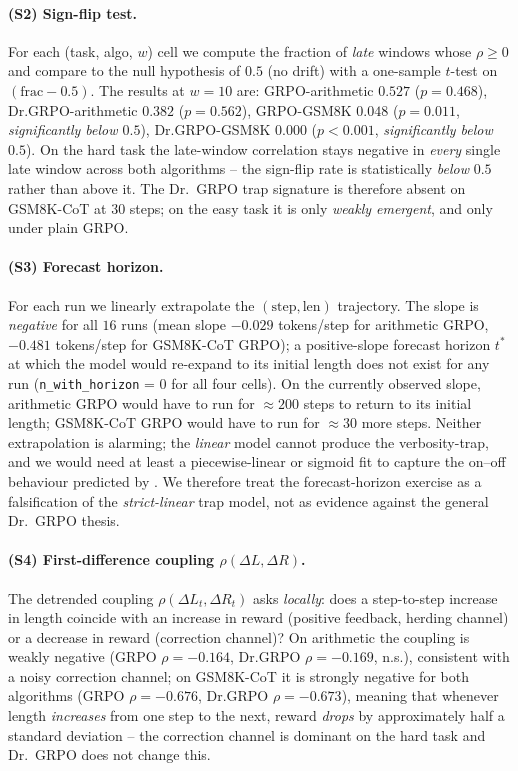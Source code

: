 \documentclass{article}
\begin{document}
\paragraph{(S2) Sign-flip test.}
For each (task, algo, $w$) cell we compute the fraction of
\emph{late} windows whose $\rho \ge 0$ and compare to the null
hypothesis of $0.5$ (no drift) with a one-sample $t$-test on
$(\mathrm{frac} - 0.5)$. The results at $w = 10$ are:
GRPO-arithmetic $0.527$ ($p = 0.468$), Dr.GRPO-arithmetic
$0.382$ ($p = 0.562$), GRPO-GSM8K $0.048$ ($p = 0.011$,
\emph{significantly below $0.5$}), Dr.GRPO-GSM8K $0.000$
($p < 0.001$, \emph{significantly below $0.5$}). On the
hard task the late-window correlation stays negative in
\emph{every} single late window across both algorithms -- the
sign-flip rate is statistically \emph{below} $0.5$ rather than
above it. The Dr.~GRPO trap signature is therefore absent on
GSM8K-CoT at $30$ steps; on the easy task it is only \emph{weakly
emergent}, and only under plain GRPO.

\paragraph{(S3) Forecast horizon.}
For each run we linearly extrapolate the
$(\mathrm{step}, \mathrm{len})$ trajectory. The slope is
\emph{negative} for all $16$ runs (mean slope $-0.029$ tokens/step
for arithmetic GRPO, $-0.481$ tokens/step for GSM8K-CoT GRPO);
a positive-slope forecast horizon $t^*$ at which the model would
re-expand to its initial length does not exist for any run
(\texttt{n\_with\_horizon} = 0 for all four cells). On the
currently observed slope, arithmetic GRPO would have to run for
$\approx 200$ steps to return to its initial length; GSM8K-CoT
GRPO would have to run for $\approx 30$ more steps. Neither
extrapolation is alarming; the \emph{linear} model cannot
produce the verbosity-trap, and we would need at least a
piecewise-linear or sigmoid fit to capture the on--off
behaviour predicted by \cite{tong2025drgrpo}. We therefore
treat the forecast-horizon exercise as a falsification of the
\emph{strict-linear} trap model, not as evidence against the
general Dr.~GRPO thesis.

\paragraph{(S4) First-difference coupling $\rho(\Delta L, \Delta R)$.}
The detrended coupling $\rho(\Delta L_t, \Delta R_t)$ asks
\emph{locally}: does a step-to-step increase in length coincide
with an increase in reward (positive feedback, herding channel)
or a decrease in reward (correction channel)? On arithmetic the
coupling is weakly negative (GRPO $\rho = -0.164$, Dr.GRPO
$\rho = -0.169$, n.s.), consistent with a noisy correction
channel; on GSM8K-CoT it is strongly negative for both
algorithms (GRPO $\rho = -0.676$, Dr.GRPO $\rho = -0.673$),
meaning that whenever length \emph{increases} from one step to
the next, reward \emph{drops} by approximately half a standard
deviation -- the correction channel is dominant on the hard
task and Dr.~GRPO does not change this.
\end{document}

